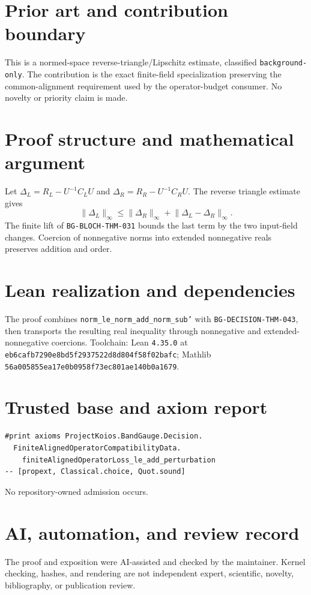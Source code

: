 \documentclass[11pt]{article}
\begin{document}
\section{Prior art and contribution boundary}
This is a normed-space reverse-triangle/Lipschitz estimate, classified \texttt{background-only}.  The contribution is the exact finite-field specialization preserving the common-alignment requirement used by the operator-budget consumer.  No novelty or priority claim is made.

\section{Proof structure and mathematical argument}
Let $\Delta_L=R_L-U^{-1}C_LU$ and $\Delta_R=R_R-U^{-1}C_RU$.  The reverse triangle estimate gives
\[
 \lVert\Delta_L\rVert_\infty\leq
 \lVert\Delta_R\rVert_\infty+\lVert\Delta_L-\Delta_R\rVert_\infty.
\]
The finite lift of \texttt{BG-BLOCH-THM-031} bounds the last term by the two input-field changes.  Coercion of nonnegative norms into extended nonnegative reals preserves addition and order.

\section{Lean realization and dependencies}
The proof combines \texttt{norm\_le\_norm\_add\_norm\_sub'} with \texttt{BG-DECISION-THM-043}, then transports the resulting real inequality through nonnegative and extended-nonnegative coercions.  Toolchain: Lean \texttt{4.35.0} at \texttt{eb6cafb7290e8bd5f2937522d8d804f58f02bafc}; Mathlib \texttt{56a005855ea17e0b0958f73ec801ae140b0a1679}.

\section{Trusted base and axiom report}
\begin{verbatim}
#print axioms ProjectKoios.BandGauge.Decision.
  FiniteAlignedOperatorCompatibilityData.
    finiteAlignedOperatorLoss_le_add_perturbation
-- [propext, Classical.choice, Quot.sound]
\end{verbatim}
No repository-owned admission occurs.

\section{AI, automation, and review record}
The proof and exposition were AI-assisted and checked by the maintainer.  Kernel checking, hashes, and rendering are not independent expert, scientific, novelty, bibliography, or publication review.
\end{document}
